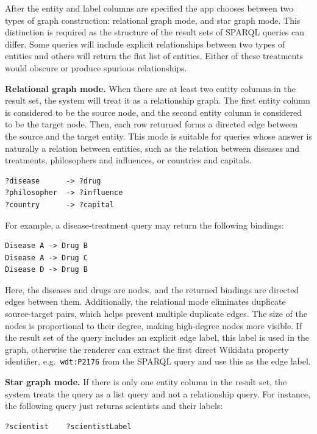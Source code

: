 \documentclass[11pt,a4paper]{article}
\begin{document}
After the entity and label columns are specified the app chooses between two types of graph construction: relational graph mode, and star graph mode. This distinction is required as the structure of the result sets of SPARQL queries can differ. Some queries will include explicit relationships between two types of entities and others will return the flat list of entities. Either of these treatments would obscure or produce spurious relationships.

\textbf{Relational graph mode.} When there are at least two entity columns in the result set, the system will treat it as a relationship graph. The first entity column is considered to be the source node, and the second entity column is considered to be the target node. Then, each row returned forms a directed edge between the source and the target entity. This mode is suitable for queries whose answer is naturally a relation between entities, such as the relation between diseases and treatments, philosophers and influences, or countries and capitals.

\begin{lstlisting}[style=plainStyle]
?disease      -> ?drug
?philosopher  -> ?influence
?country      -> ?capital
\end{lstlisting}

For example, a disease-treatment query may return the following bindings:

\begin{lstlisting}[style=plainStyle]
Disease A -> Drug B
Disease A -> Drug C
Disease D -> Drug B
\end{lstlisting}

Here, the diseases and drugs are nodes, and the returned bindings are directed edges between them. Additionally, the relational mode eliminates duplicate source-target pairs, which helps prevent multiple duplicate edges. The size of the nodes is proportional to their degree, making high-degree nodes more visible. If the result set of the query includes an explicit edge label, this label is used in the graph, otherwise the renderer can extract the first direct Wikidata property identifier, e.g.\ \texttt{wdt:P2176} from the SPARQL query and use this as the edge label.

\textbf{Star graph mode.} If there is only one entity column in the result set, the system treats the query as a list query and not a relationship query. For instance, the following query just returns scientists and their labels:

\begin{lstlisting}[style=plainStyle]
?scientist    ?scientistLabel
\end{lstlisting}
\end{document}
